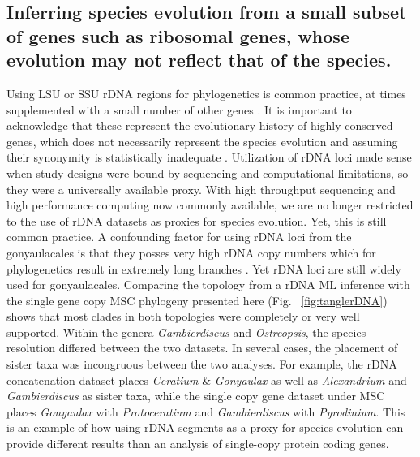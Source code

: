 \documentclass[12pt]{article}
\begin{document}
\subsection*{Inferring species evolution from a small subset of genes such as ribosomal genes, whose evolution may not reflect that of the species.}
\FloatBarrier 
Using LSU or SSU rDNA regions for phylogenetics is common practice, at times supplemented with a small number of other genes \cite{shalchian2006combined,zhang2007three,saldarriaga2004molecular,murray2005improving,hoppenrath2010dinoflagellate}. 
It is important to acknowledge that these represent the evolutionary history of highly conserved genes, which does not necessarily represent the species evolution and assuming their synonymity is statistically inadequate \cite{degnan2009gene}.
Utilization of rDNA loci made sense when study designs were bound by sequencing and computational limitations, so they were a universally available proxy. 
With high throughput sequencing and high performance computing now commonly available, we are no longer restricted to the use of rDNA datasets as proxies for species evolution. 
Yet, this is still common practice. 
A confounding factor for using rDNA loci from the gonyaulacales is that they posses very high rDNA copy numbers which for phylogenetics result in extremely long branches \cite{he2016reducing}. 
Yet rDNA loci are still widely used for gonyaulacales. 
Comparing the topology from a rDNA ML inference with the single gene copy MSC phylogeny presented here (Fig. ~\ref{fig:tanglerDNA}) shows that most clades in both topologies were completely or very well supported. 
Within the genera \emph{Gambierdiscus} and \emph{Ostreopsis}, the species resolution differed between the two datasets. 
In several cases, the placement of sister taxa was incongruous between the two analyses. 
For example, the rDNA concatenation dataset places \emph{Ceratium} \& \emph{Gonyaulax} as well as \emph{Alexandrium} and \emph{Gambierdiscus} as sister taxa, while the single copy gene dataset under MSC places \emph{Gonyaulax} with \emph{Protoceratium} and \emph{Gambierdiscus} with \emph{Pyrodinium}. 
This is an example of how using rDNA segments as a proxy for species evolution can provide different results than an analysis of single-copy protein coding genes.
\end{document}
